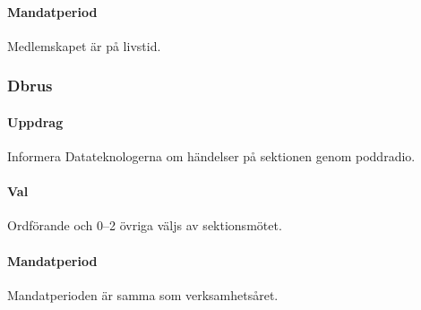 \paragraph{Mandatperiod}
Medlemskapet är på livstid.

\subsubsection{Dbrus}
\paragraph{Uppdrag}
Informera Datateknologerna om händelser på sektionen genom poddradio.
\paragraph{Val}
Ordförande och 0–2 övriga väljs av sektionsmötet.
\paragraph{Mandatperiod}
Mandatperioden är samma som verksamhetsåret.
\newpage
